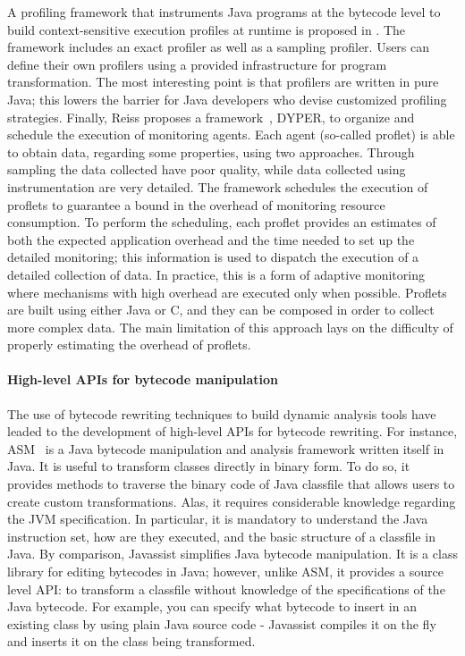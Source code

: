 A profiling framework that instruments Java programs at the bytecode level to build context-sensitive execution profiles at runtime is proposed in \cite{Binder2005}.
The framework includes an exact profiler as well as a sampling profiler.
Users can define their own profilers using a provided infrastructure for program transformation.
The most interesting point is that profilers are written in pure Java; this lowers the barrier for Java developers who devise customized profiling strategies.
Finally, Reiss proposes a framework~\cite{Reiss:2008:CDP:1383559.1383566}, DYPER, to organize and schedule the execution of monitoring agents.
Each agent (so-called proflet) is able to obtain data, regarding some properties, using two approaches.
Through sampling the data collected have poor quality, while data collected using instrumentation are very detailed.
The framework schedules the execution of proflets to guarantee a bound in the overhead of monitoring resource consumption.
To perform the scheduling, each proflet provides an estimates of both the expected application overhead and the time needed to set up the detailed monitoring; this information is used to dispatch the execution of a detailed collection of data.
In practice, this is a form of adaptive monitoring where mechanisms with high overhead are executed only when possible.
Proflets are built using either Java or C, and they can be composed in order to collect more complex data.
The main limitation of this approach
lays on the difficulty of properly estimating the overhead of proflets.

\paragraph{High-level APIs for bytecode manipulation}
The use of bytecode rewriting techniques to build dynamic analysis tools have leaded to the development of high-level APIs for bytecode rewriting.
For instance, ASM~\cite{Bruneton2002,Kuleshov2007} is a Java bytecode manipulation and analysis framework written itself in Java.
It is useful to transform classes directly in binary form.
To do so, it provides methods to traverse the binary code of Java classfile that allows users to create custom transformations.
Alas, it requires considerable knowledge regarding the JVM specification.
In particular, it is mandatory to understand the Java instruction set, how are they executed, and the basic structure of a classfile in Java.
By comparison, Javassist \cite{Javassist1999} simplifies Java bytecode manipulation.
It is a class library for editing bytecodes in Java; however, unlike ASM, it provides a source level API: to transform a classfile without knowledge of the specifications of the Java bytecode.
For example, you can specify what bytecode to insert in an existing class by using plain Java source code - Javassist compiles it on the fly and inserts it on the class being transformed.

